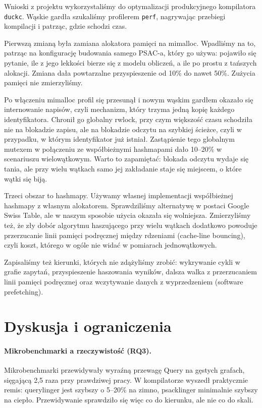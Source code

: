 \documentclass[11pt,a4paper]{article}
\begin{document}
Wnioski z projektu wykorzystaliśmy do optymalizacji produkcyjnego kompilatora
\texttt{duckc}. Wąskie gardła szukaliśmy profilerem \texttt{perf}, nagrywając
przebiegi kompilacji i patrząc, gdzie schodzi czas.

Pierwszą zmianą była zamiana alokatora pamięci na mimalloc. Wpadliśmy na to,
patrząc na konfigurację budowania samego PSAC-a, który go używa: pojawiło się
pytanie, ile z jego lekkości bierze się z modelu obliczeń, a ile po prostu
z tańszych alokacji. Zmiana dała powtarzalne przyspieszenie od 10\% do nawet
50\%. Zużycia pamięci nie zmierzyliśmy.

Po włączeniu mimalloc profil się przesunął i nowym wąskim gardłem okazało się
internowanie napisów, czyli mechanizm, który trzyma jedną kopię każdego
identyfikatora. Chronił go globalny rwlock, przy czym większość czasu schodziła
nie na blokadzie zapisu, ale na blokadzie odczytu na szybkiej ścieżce, czyli
w przypadku, w którym identyfikator już istniał. Zastąpienie tego globalnym
mutexem w połączeniu ze współbieżnymi hashmapami dało 10--20\% w scenariuszu
wielowątkowym. Warto to zapamiętać: blokada odczytu wydaje się tania, ale przy %
wielu wątkach samo jej zakładanie staje się miejscem, o które wątki się biją.

Trzeci obszar to hashmapy. Używamy własnej implementacji współbieżnej hashmapy
z własnym alokatorem. Sprawdziliśmy alternatywę w postaci Google Swiss Table, ale
w naszym sposobie użycia okazała się wolniejsza. Zmierzyliśmy też, że zły dobór
algorytmu haszującego przy wielu wątkach dodatkowo powoduje przerzucanie linii
pamięci podręcznej między rdzeniami (cache-line bouncing), czyli koszt, którego
w ogóle nie widać w pomiarach jednowątkowych.

Zapisaliśmy też kierunki, których nie zdążyliśmy zrobić: wykrywanie cykli %
w grafie zapytań, przyspieszenie haszowania wyników, dalsza walka
z przerzucaniem linii pamięci podręcznej oraz wczytywanie danych z wyprzedzeniem
(software prefetching).

\section{Dyskusja i ograniczenia}
\label{sec:dyskusja}

\paragraph{Mikrobenchmarki a rzeczywistość (RQ3).} Mikrobenchmarki
przewidywały wyraźną przewagę Query na gęstych grafach, sięgającą 2,5 raza przy
prawdziwej pracy. W kompilatorze wyszedł praktycznie remis: querylinger jest
szybszy o 5--20\% na zimno, psacklinger minimalnie szybszy na ciepło.
Przewidywanie sprawdziło się więc co do kierunku, ale nie co do skali. %
\end{document}
